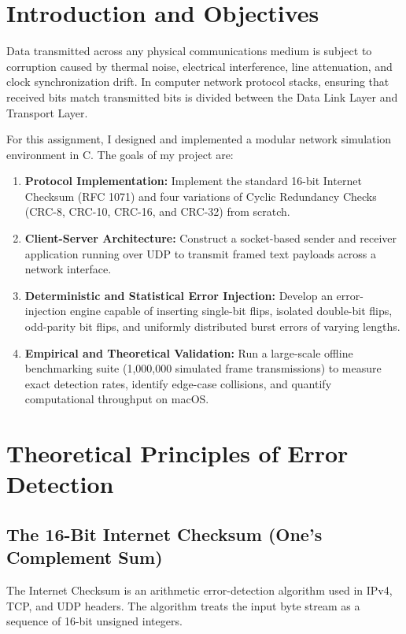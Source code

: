 \documentclass[12pt,a4paper]{article}
\begin{document}
\section{Introduction and Objectives}

Data transmitted across any physical communications medium is subject to corruption caused by thermal noise, electrical interference, line attenuation, and clock synchronization drift. In computer network protocol stacks, ensuring that received bits match transmitted bits is divided between the Data Link Layer and Transport Layer. 

For this assignment, I designed and implemented a modular network simulation environment in C. The goals of my project are:
\begin{enumerate}[leftmargin=*]
    \item \textbf{Protocol Implementation:} Implement the standard 16-bit Internet Checksum (RFC 1071) and four variations of Cyclic Redundancy Checks (CRC-8, CRC-10, CRC-16, and CRC-32) from scratch.
    \item \textbf{Client-Server Architecture:} Construct a socket-based sender and receiver application running over UDP to transmit framed text payloads across a network interface.
    \item \textbf{Deterministic and Statistical Error Injection:} Develop an error-injection engine capable of inserting single-bit flips, isolated double-bit flips, odd-parity bit flips, and uniformly distributed burst errors of varying lengths.
    \item \textbf{Empirical and Theoretical Validation:} Run a large-scale offline benchmarking suite (1,000,000 simulated frame transmissions) to measure exact detection rates, identify edge-case collisions, and quantify computational throughput on macOS.
\end{enumerate}

\section{Theoretical Principles of Error Detection}

\subsection{The 16-Bit Internet Checksum (One's Complement Sum)}
The Internet Checksum is an arithmetic error-detection algorithm used in IPv4, TCP, and UDP headers. The algorithm treats the input byte stream as a sequence of 16-bit unsigned integers. 
\end{document}
